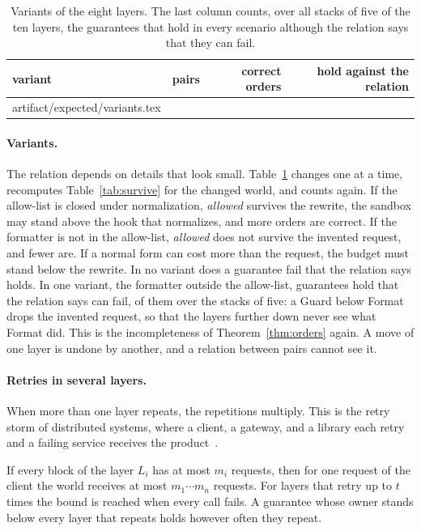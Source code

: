\documentclass[acmsmall,nonacm,screen]{acmart}
\makeatletter
\newcommand{\ly}[1]{\textsf{#1}}
\newcommand{\claim}[2]{#2}
\newcommand{\rows}[1]{\@@input artifact/expected/#1.tex }
\makeatother
\begin{document}
\begin{table}
\caption{Variants of the eight layers. The last column counts, over all stacks of five of the
ten layers, the guarantees that hold in every scenario although the relation says that they
can fail.}
\label{tab:variants}
\begin{tabular}{lrrr}
\toprule
variant & pairs & correct orders & hold against the relation \\
\midrule
\rows{variants}
\bottomrule
\end{tabular}
\end{table}

\paragraph{Variants.} The relation depends on details that look small.
Table~\ref{tab:variants} changes one at a time, recomputes Table~\ref{tab:survive} for the
changed world, and counts again. If the allow-list is closed under normalization,
\emph{allowed} survives the rewrite, the sandbox may stand above the hook that normalizes,
and more orders are correct. If the formatter is not in the allow-list, \emph{allowed} does
not survive the invented request, and fewer are. If a normal form can cost more than the
request, the budget must stand below the rewrite. \claim{variants}{In no variant does a
guarantee fail that the relation says holds. In one variant, the formatter outside the
allow-list, guarantees hold that the relation says can fail}, \exHiddenOutside{} of them over
the stacks of five: a \ly{Guard} below \ly{Format} drops the invented request, so that the
layers further down never see what \ly{Format} did. This is the incompleteness of
Theorem~\ref{thm:orders} again. A move of one layer is undone by another, and a relation
between pairs cannot see it.

\paragraph{Retries in several layers.} When more than one layer repeats, the repetitions
multiply. This is the retry storm of distributed systems, where a client, a gateway, and a
library each retry and a failing service receives the product~\cite{bronson2021}.

\begin{proposition}
\label{prop:multiply}
If every block of the layer $L_i$ has at most $m_i$ requests, then for one request of the
client the world receives at most $m_1 \cdots m_n$ requests. For layers that retry up to $t$
times the bound is reached when every call fails. A guarantee whose owner stands below every
layer that repeats holds however often they repeat.
\end{proposition}
\end{document}
